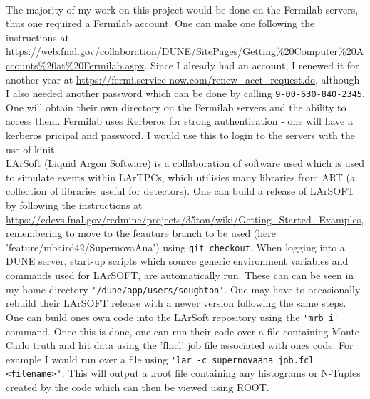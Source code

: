 \documentclass[a4paper,12,oneside,notitlepage]{report}
\begin{document}
\vspace{0.5cm}
\\The majority of my work on this project would be done on the Fermilab servers, thus one required a Fermilab account. One can make one following the instructions at \url{https://web.fnal.gov/collaboration/DUNE/SitePages/Getting%20Computer%20Accounts%20at%20Fermilab.aspx}. Since I already had an account, I renewed it for another year at \url{https://fermi.service-now.com/renew_acct_request.do}, although I also needed another password which can be done by calling \verb|9-00-630-840-2345|.
One will obtain their own directory on the Fermilab servers and the ability to access them. Fermilab uses Kerberos for strong authentication - one will have a kerberos pricipal and password. I would use this to login to the servers with the use of kinit. 
\vspace{0.5cm}
\\LArSoft (Liquid Argon Software) is a collaboration of software used which is used to simulate events within LArTPCs, which utilisies many libraries from ART (a collection of libraries useful for detectors). One can build a release of LArSOFT by following the instructions at \url{https://cdcvs.fnal.gov/redmine/projects/35ton/wiki/Getting_Started_Examples}, remembering to move to the feauture branch to be used (here 'feature/mbaird42/SupernovaAna') using \verb|git checkout|. When logging into a DUNE server, start-up scripts which source generic environment variables and commands used for LArSOFT, are automatically run. These can can be seen in my home directory \verb|'/dune/app/users/soughton'|. One may have to occasionally rebuild their LArSOFT release with a newer version following the same steps. One can build ones own code into the LArSoft repository using the \verb|'mrb i'| command. Once this is done, one can run their code over a file containing Monte Carlo truth and hit data using the 'fhicl' job file associated with ones code. For example I would run over a file using \verb|'lar -c supernovaana_job.fcl <filename>'|. This will output a .root file containing any histograms or N-Tuples created by the code which can then be viewed using ROOT.
\end{document}
